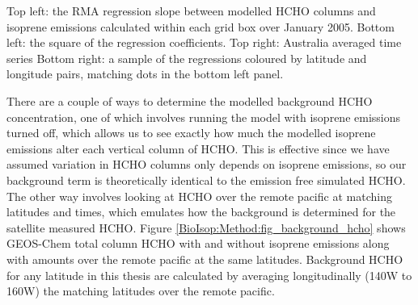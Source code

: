     
    { %
      Top left: the RMA regression slope between modelled HCHO columns and isoprene emissions calculated within each grid box over January 2005.
      Bottom left: the square of the regression coefficients.
      Top right: Australia averaged time series 
      Bottom right: a sample of the regressions coloured by latitude and longitude pairs, matching dots in the bottom left panel.
    }
    {\label{BioIsop:Method:slope:fig_regressions}}
    
    
    
    There are a couple of ways to determine the modelled background HCHO concentration, one of which involves running the model with isoprene emissions turned off, which allows us to see exactly how much the modelled isoprene emissions alter each vertical column of HCHO.
    This is effective since we have assumed variation in HCHO columns only depends on isoprene emissions, so our background term is theoretically identical to the emission free simulated HCHO.
    The other way involves looking at HCHO over the remote pacific at matching latitudes and times, which emulates how the background is determined for the satellite measured HCHO.
    Figure \ref{BioIsop:Method:fig_background_hcho} shows GEOS-Chem total column HCHO with and without isoprene emissions along with amounts over the remote pacific at the same latitudes.
    Background HCHO for any latitude in this thesis are calculated by averaging longitudinally (140\degr W to 160\degr W) the matching latitudes over the remote pacific.
    
